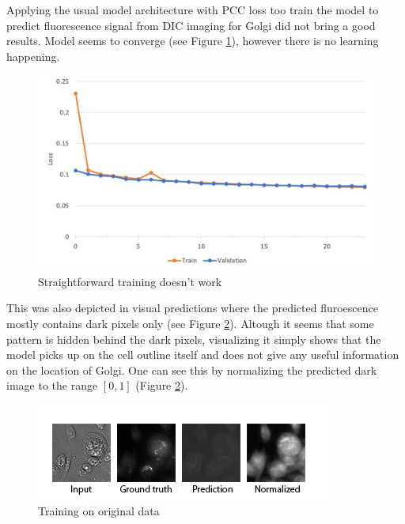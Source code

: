 Applying the usual model architecture with PCC loss too train the model to predict fluorescence signal from DIC imaging for Golgi did not bring a good results. Model seems to converge (see Figure \ref{fig:golgi-no-reg-pcc}), however there is no learning happening.
\begin{figure}[H]
	\begin{center}
		\includegraphics[width=0.8\linewidth]{bilder/golgi/pcc-no-reg.jpg}
		\caption{Straightforward training doesn't work}\label{fig:golgi-no-reg-pcc}
	\end{center}
\end{figure}

This was also depicted in visual predictions where the predicted fluroescence mostly contains dark pixels only (see Figure \ref{fig:golgi-no-reg-pcc-predictions}). Altough it seems that some pattern is hidden behind the dark pixels, visualizing it simply shows that the model picks up on the cell outline itself and does not give any useful information on the location of Golgi. One can see this by normalizing the predicted dark image to the range $[0,1]$ (Figure \ref{fig:golgi-no-reg-pcc-predictions}).
\begin{figure}[htb]
	\begin{center}
		\includegraphics[width=0.8\linewidth]{bilder/golgi/too-dark.png}
		\caption{Training on original data}\label{fig:golgi-no-reg-pcc-predictions}
	\end{center}
\end{figure}


